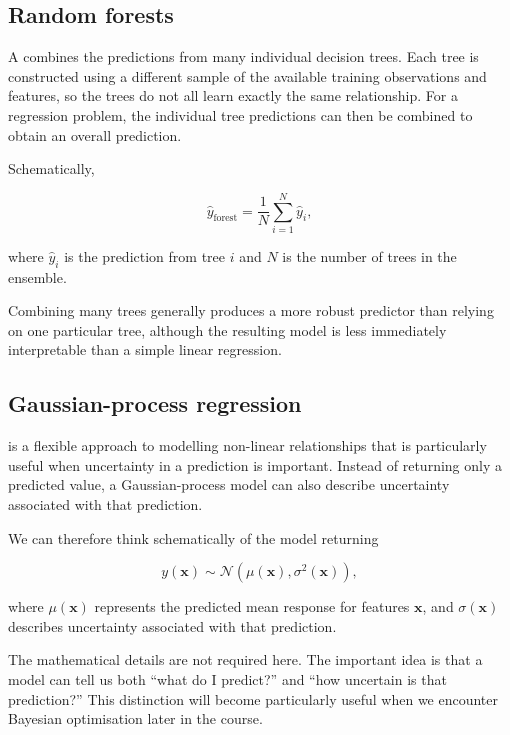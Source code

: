 \subsection{Random forests}

A  combines the predictions from many individual decision trees.
Each tree is constructed using a different sample of the available training observations and features, so the trees do not all learn exactly the same relationship.
For a regression problem, the individual tree predictions can then be combined to obtain an overall prediction.

Schematically,

\begin{equation}
  \hat{y}_{\mathrm{forest}} = \frac{1}{N} \sum_{i=1}^{N} \hat{y}_i,
\end{equation}

where \(\hat{y}_i\) is the prediction from tree \(i\) and \(N\) is the number of trees in the ensemble.

Combining many trees generally produces a more robust predictor than relying on one particular tree, although the resulting model is less immediately interpretable than a simple linear regression.

\subsection{Gaussian-process regression}

 is a flexible approach to modelling non-linear relationships that is particularly useful when uncertainty in a prediction is important.
Instead of returning only a predicted value, a Gaussian-process model can also describe uncertainty associated with that prediction.

We can therefore think schematically of the model returning

\begin{equation}
  y(\mathbf{x}) \sim \mathcal{N} \left( \mu(\mathbf{x}), \sigma^2(\mathbf{x}) \right),
\end{equation}

where \(\mu(\mathbf{x})\) represents the predicted mean response for features \(\mathbf{x}\), and \(\sigma(\mathbf{x})\) describes uncertainty associated with that prediction.

The mathematical details are not required here.
The important idea is that a model can tell us both \enquote{what do I predict?}
and \enquote{how uncertain is that prediction?}
This distinction will become particularly useful when we encounter Bayesian optimisation later in the course.

